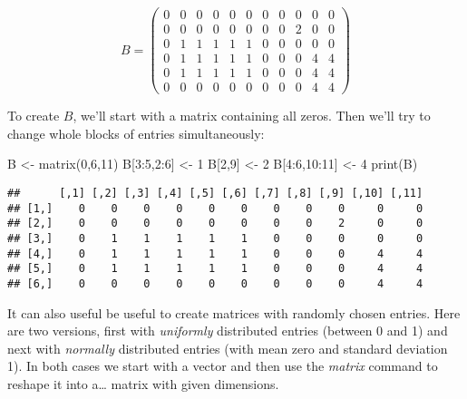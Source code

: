 \documentclass[
]{article}
\newenvironment{Shaded}{\begin{snugshade}}{\end{snugshade}}
\newcommand{\DecValTok}[1]{\textcolor[rgb]{0.00,0.00,0.81}{#1}}
\newcommand{\FunctionTok}[1]{\textcolor[rgb]{0.00,0.00,0.00}{#1}}
\newcommand{\NormalTok}[1]{#1}
\newcommand{\OtherTok}[1]{\textcolor[rgb]{0.56,0.35,0.01}{#1}}
\newcommand{\SpecialCharTok}[1]{\textcolor[rgb]{0.00,0.00,0.00}{#1}}
\begin{document}
\[ B = \begin{pmatrix}0&0&0&0&0&0&0&0&0&0&0\\
0&0&0&0&0&0&0&0&2&0&0\\
0&1&1&1&1&1&0&0&0&0&0\\
0&1&1&1&1&1&0&0&0&4&4\\
0&1&1&1&1&1&0&0&0&4&4\\
0&0&0&0&0&0&0&0&0&4&4\end{pmatrix}\]

To create \(B\), we'll start with a matrix containing all zeros. Then
we'll try to change whole blocks of entries simultaneously:

\begin{Shaded}
\begin{Highlighting}[]
\NormalTok{B }\OtherTok{\textless{}{-}} \FunctionTok{matrix}\NormalTok{(}\DecValTok{0}\NormalTok{,}\DecValTok{6}\NormalTok{,}\DecValTok{11}\NormalTok{)}
\NormalTok{B[}\DecValTok{3}\SpecialCharTok{:}\DecValTok{5}\NormalTok{,}\DecValTok{2}\SpecialCharTok{:}\DecValTok{6}\NormalTok{] }\OtherTok{\textless{}{-}} \DecValTok{1}
\NormalTok{B[}\DecValTok{2}\NormalTok{,}\DecValTok{9}\NormalTok{] }\OtherTok{\textless{}{-}} \DecValTok{2}
\NormalTok{B[}\DecValTok{4}\SpecialCharTok{:}\DecValTok{6}\NormalTok{,}\DecValTok{10}\SpecialCharTok{:}\DecValTok{11}\NormalTok{] }\OtherTok{\textless{}{-}} \DecValTok{4}
\FunctionTok{print}\NormalTok{(B)}
\end{Highlighting}
\end{Shaded}

\begin{verbatim}
##      [,1] [,2] [,3] [,4] [,5] [,6] [,7] [,8] [,9] [,10] [,11]
## [1,]    0    0    0    0    0    0    0    0    0     0     0
## [2,]    0    0    0    0    0    0    0    0    2     0     0
## [3,]    0    1    1    1    1    1    0    0    0     0     0
## [4,]    0    1    1    1    1    1    0    0    0     4     4
## [5,]    0    1    1    1    1    1    0    0    0     4     4
## [6,]    0    0    0    0    0    0    0    0    0     4     4
\end{verbatim}

It can also useful be useful to create matrices with randomly chosen
entries. Here are two versions, first with \emph{uniformly} distributed
entries (between 0 and 1) and next with \emph{normally} distributed
entries (with mean zero and standard deviation 1). In both cases we
start with a vector and then use the \emph{matrix} command to reshape it
into a\ldots{} matrix with given dimensions.
\end{document}
